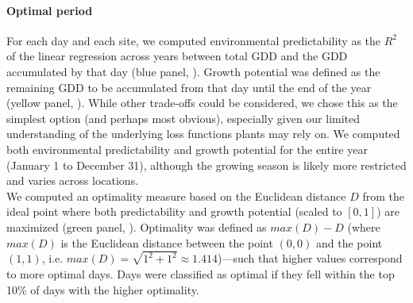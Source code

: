 \documentclass[11pt,letter]{article}
\begin{document}
\paragraph{Optimal period} For each day and each site, we computed environmental predictability as the $R^2$ of the linear regression across years between total GDD and the GDD accumulated by that day (blue panel, ). Growth potential was defined as the remaining GDD to be accumulated from that day until the end of the year (yellow panel, ). While other trade-offs could be considered, we chose this as the simplest option (and perhaps most obvious), especially given our limited understanding of the underlying loss functions plants may rely on. We computed both environmental predictability and growth potential for the entire year (January 1 to December 31), although the growing season is likely more restricted and varies across locations. \\
We computed an optimality measure based on the Euclidean distance $D$ from  the ideal point where both predictability and growth potential (scaled to $[0,1]$) are maximized (green panel, ). Optimality was defined as $max(D)-D$ (where $max(D)$ is the Euclidean distance between the point $(0,0)$ and the point $(1,1)$, i.e. $max(D)=\sqrt{1^2+1^2}\approx1.414$)---such that higher values correspond to more optimal days. Days were classified as optimal if they fell within the top 10\% of days with the higher optimality.

\let\oldthefigure\thefigure
\renewcommand{\thefigure}{S\oldthefigure}
\setcounter{figure}{0}  

\vspace{2cm}
\end{document}
